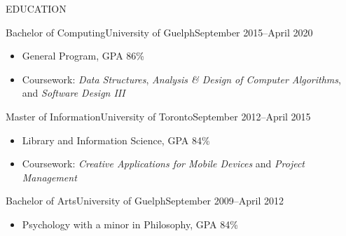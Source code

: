 \documentclass[]{mcdowellcv}
\begin{document}
	\makeheader
	
	\begin{cvsection}{EDUCATION}
		\begin{cvsubsection}{Bachelor of Computing}{University of Guelph}{September 2015--April 2020}
			\begin{itemize}
				\item General Program, GPA 86\%
				\item Coursework: \textit{Data Structures}, \textit{Analysis \& Design of Computer Algorithms}, and \textit{Software Design III}
			\end{itemize}
		\end{cvsubsection}

		\begin{cvsubsection}{Master of Information}{University of Toronto}{September 2012--April 2015}
			\begin{itemize}
				\item Library and Information Science, GPA 84\%
  			\item Coursework: \textit{Creative Applications for Mobile Devices} and \textit{Project Management}
			\end{itemize}
		\end{cvsubsection}

		\begin{cvsubsection}{Bachelor of Arts}{University of Guelph}{September 2009--April 2012}
			\begin{itemize}
				\item Psychology with a minor in Philosophy, GPA 84\%
			\end{itemize}
		\end{cvsubsection}
	\end{cvsection}
\end{document}
